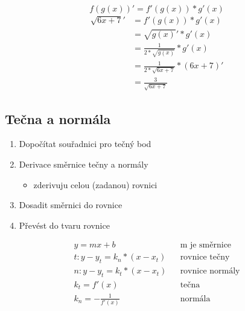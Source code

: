 $$f(g(x))' = f'(g(x))*g'(x)$$
\begin{align*}
  \sqrt{6x+7}' &= f'(g(x))*g'(x)\\
  &= \sqrt{g(x)}'*g'(x)\\
  &= \frac{1}{2*\sqrt{g(x)}}*g'(x)\\
  &= \frac{1}{2*\sqrt{6x+7}}*(6x+7)'\\
  &= \frac{3}{\sqrt{6x+7}}
\end{align*}
\subsection{Tečna a normála}
\begin{enumerate}
  \item Dopočítat souřadnici pro tečný bod
  \item Derivace směrnice tečny a normály
    \begin{itemize}
      \item zderivuju celou (zadanou) rovnici
    \end{itemize}
  \item Dosadit směrnici do rovnice
  \item Převést do tvaru rovnice
\end{enumerate}
\begin{eqnarray*}
  y = mx+b & & \text{m je směrnice} \\
  t: y-y_t=k_n*(x-x_t) & & \text{rovnice tečny} \\
  n: y-y_t=k_t*(x-x_t) & & \text{rovnice normály} \\
  k_t = f'(x) & & \text{tečna} \\
  k_n = -\frac{1}{f'(x)} & & \text{normála}
\end{eqnarray*}

